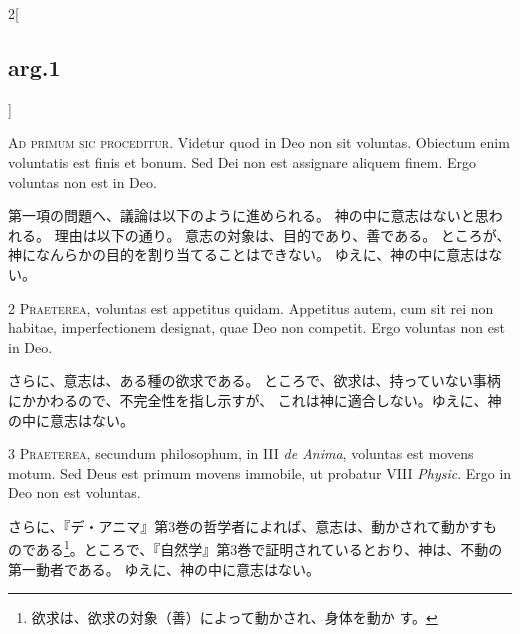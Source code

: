 \documentclass[paper=a4paper,fontsize=10pt,jafontsize=9pt,titlepage]{jlreq}
\begin{document}
\begin{paracol}{2}[\subsection{arg.1}]


{\huge A}{\scshape d primum sic proceditur}. Videtur quod in
Deo non sit voluntas. Obiectum enim voluntatis est finis et bonum. Sed
Dei non est assignare aliquem finem. Ergo voluntas non est in Deo.

\switchcolumn

第一項の問題へ、議論は以下のように進められる。
 神の中に意志はないと思われる。
 理由は以下の通り。
 意志の対象は、目的であり、善である。
 ところが、神になんらかの目的を割り当てることはできない。
 ゆえに、神の中に意志はない。



{\scshape 2 Praeterea}, voluntas est appetitus
quidam. Appetitus autem, cum sit rei non habitae, imperfectionem
designat, quae Deo non competit. Ergo voluntas non est in Deo.

\switchcolumn

さらに、意志は、ある種の欲求である。
 ところで、欲求は、持っていない事柄にかかわるので、不完全性を指し示すが、
 これは神に適合しない。ゆえに、神の中に意志はない。



{\scshape 3 Praeterea}, secundum philosophum, in III {\itshape de
Anima}, voluntas est movens motum. Sed Deus est primum movens
immobile, ut probatur VIII {\itshape Physic}. Ergo in Deo non est voluntas.

\switchcolumn

さらに、『デ・アニマ』第3巻の哲学者によれば、意志は、動かされて動かすも
 のである\footnote{欲求は、欲求の対象（善）によって動かされ、身体を動か
 す。}。ところで、『自然学』第3巻で証明されているとおり、神は、不動の
 第一動者である。
 ゆえに、神の中に意志はない。

\switchcolumn*[\subsection{s.c.}]



\end{paracol}
\end{document}
